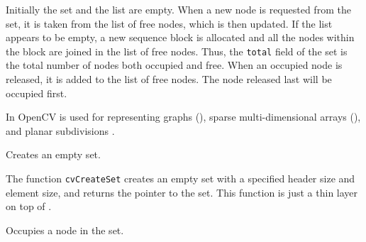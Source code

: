 Initially the set and the list are empty. When a new node is requested
from the set, it is taken from the list of free nodes, which is then updated. If the list appears to be empty, a new sequence block is allocated
and all the nodes within the block are joined in the list of free
nodes. Thus, the \texttt{total} field of the set is the total number of nodes
both occupied and free. When an occupied node is released, it is added
to the list of free nodes. The node released last will be occupied first.

In OpenCV  is used for representing graphs (),
sparse multi-dimensional arrays (), and planar subdivisions
.

\label{CreateSet}

Creates an empty set.


\begin{description}
\end{description}

The function \texttt{cvCreateSet} creates an empty set with a specified header size and element size, and returns the pointer to the set. This function is just a thin layer on top of .

\label{SetAdd}

Occupies a node in the set.


\begin{description}
\end{description}

